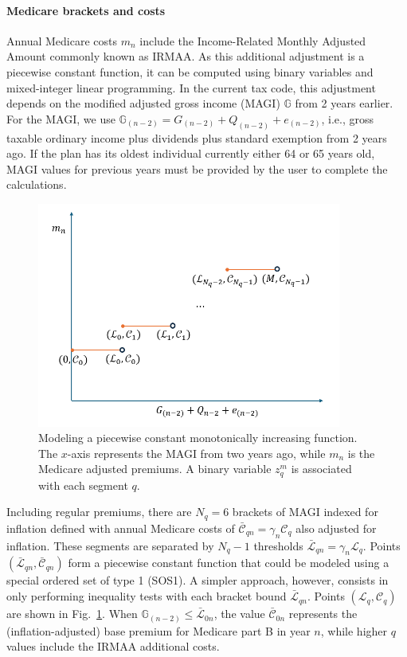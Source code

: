 \documentclass{report}[fleqn,12pt]
\begin{document}
\paragraph*{Medicare brackets and costs}
	Annual Medicare costs $m_n$ include the Income-Related Monthly Adjusted Amount
	commonly known as IRMAA.
	As this additional adjustment
	is a piecewise constant function,
        it can be computed using binary variables and mixed-integer linear
	programming. In the current tax code, this adjustment
	depends on the modified adjusted gross income (MAGI) $\mathbb{G}$ from 2 years earlier. For the
	MAGI, we use $\mathbb{G}_{(n-2)} = G_{(n-2)} + Q_{(n-2)} + e_{(n-2)}$,
	i.e., gross taxable ordinary income plus dividends
	plus standard exemption from 2 years ago.
	If the plan
        has its oldest individual currently either 64 or 65 years old, MAGI values for previous years
	must be provided by the user to complete the calculations.
	\begin{figure}[t]
	    \center\includegraphics[width=10cm]{piecewiseConstant.png}
	    \caption{\small Modeling a piecewise constant monotonically increasing function.
	    The $x$-axis represents the MAGI from two years ago, while $m_n$ is the Medicare adjusted premiums.
	    A binary variable $z_q^m$ is associated with each segment $q$.
	    \label{Fig:piecewise}}
	\end{figure}

	Including regular premiums, there are $N_q=6$ brackets
	of MAGI indexed for inflation defined with annual Medicare costs of
	$\bar{\mathcal{C}}_{qn} = \gamma_n\mathcal{C}_q$ also adjusted for inflation.
        These segments are separated by $N_q -1$ thresholds
	$\bar{\mathcal{L}}_{qn} = \gamma_n\mathcal{L}_q$.
        Points $(\bar{\mathcal{L}}_{qn}, \bar{\mathcal{C}}_{qn})$ form a piecewise
	constant function that could be modeled using a special ordered set of type 1 (SOS1).
        A simpler approach, however, consists in only performing inequality tests with
        each bracket bound $\bar{\mathcal{L}}_{qn}$.
	Points $(\mathcal{L}_q, \mathcal{C}_q)$ are shown in Fig.~\ref{Fig:piecewise}.
        When $\mathbb{G}_{(n-2)} \leq \bar{\mathcal{L}}_{0n}$,
	the value $\bar{\mathcal{C}}_{0n}$
	represents the (inflation-adjusted) base premium for Medicare part B in year $n$, while
	higher $q$ values include the IRMAA additional costs.
\end{document}
